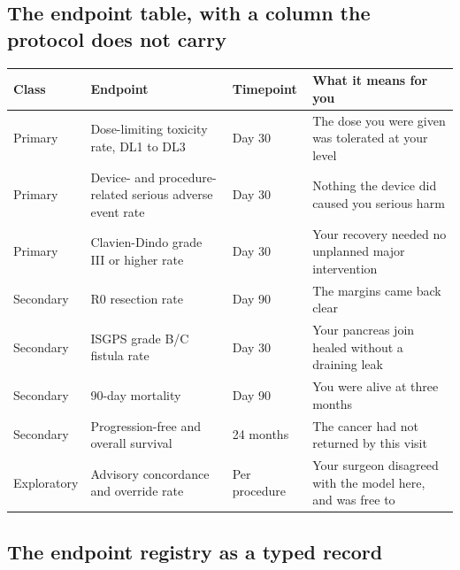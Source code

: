 \vspace{-0.7cm}

\subsection{The endpoint table, with a column the protocol does not carry}

\vspace{0.30em}

\noindent\begin{tabularx}{\textwidth}{L{2.4cm} L{4.1cm} C{2.0cm} Y}
\toprule
\textbf{Class} & \textbf{Endpoint} & \textbf{Timepoint} & \textbf{What it means for you} \\
\midrule
Primary & Dose-limiting toxicity rate, DL1 to DL3 & Day 30 & The dose you were given was tolerated at your level \\
Primary & Device- and procedure-related serious adverse event rate & Day 30 & Nothing the device did caused you serious harm \\
Primary & Clavien-Dindo grade III or higher rate & Day 30 & Your recovery needed no unplanned major intervention \\
Secondary & R0 resection rate & Day 90 & The margins came back clear \\
Secondary & ISGPS grade B/C fistula rate & Day 30 & Your pancreas join healed without a draining leak \\
Secondary & 90-day mortality & Day 90 & You were alive at three months \\
Secondary & Progression-free and overall survival & 24 months & The cancer had not returned by this visit \\
Exploratory & Advisory concordance and override rate & Per procedure & Your surgeon disagreed with the model here, and was free to \\
\bottomrule
\end{tabularx}

\vspace{0.30em}

\subsection{The endpoint registry as a typed record}

